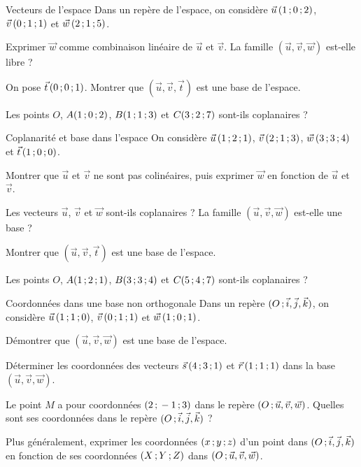 
\begin{exercice}[2]{Vecteurs de l'espace}
Dans un repère de l'espace, on considère $\vec u\,(1\,{;}\,0\,{;}\,2)$, $\vec v\,(0\,{;}\,1\,{;}\,1)$ et $\vec w\,(2\,{;}\,1\,{;}\,5)$.
\begin{questions}
  \item Exprimer $\vec w$ comme combinaison linéaire de $\vec u$ et $\vec v$. La famille $(\vec u,\vec v,\vec w)$ est-elle libre ?
  \item On pose $\vec t\,(0\,{;}\,0\,{;}\,1)$. Montrer que $(\vec u,\vec v,\vec t)$ est une base de l'espace.
  \item Les points $O$, $A(1\,{;}\,0\,{;}\,2)$, $B(1\,{;}\,1\,{;}\,3)$ et $C(3\,{;}\,2\,{;}\,7)$ sont-ils coplanaires ?
\end{questions}
\end{exercice}

\begin{exercice}[3]{Coplanarité et base dans l'espace}
On considère $\vec u\,(1\,{;}\,2\,{;}\,1)$, $\vec v\,(2\,{;}\,1\,{;}\,3)$, $\vec w\,(3\,{;}\,3\,{;}\,4)$ et $\vec t\,(1\,{;}\,0\,{;}\,0)$.
\begin{questions}
  \item Montrer que $\vec u$ et $\vec v$ ne sont pas colinéaires, puis exprimer $\vec w$ en fonction de $\vec u$ et $\vec v$.
  \item Les vecteurs $\vec u$, $\vec v$ et $\vec w$ sont-ils coplanaires ? La famille $(\vec u,\vec v,\vec w)$ est-elle une base ?
  \item Montrer que $(\vec u,\vec v,\vec t)$ est une base de l'espace.
  \item Les points $O$, $A(1\,{;}\,2\,{;}\,1)$, $B(3\,{;}\,3\,{;}\,4)$ et $C(5\,{;}\,4\,{;}\,7)$ sont-ils coplanaires ?
\end{questions}
\end{exercice}

\begin{exercice}[3]{Coordonnées dans une base non orthogonale}
Dans un repère $(O\,{;}\,\vec i,\vec j,\vec k)$, on considère $\vec u\,(1\,{;}\,1\,{;}\,0)$, $\vec v\,(0\,{;}\,1\,{;}\,1)$ et $\vec w\,(1\,{;}\,0\,{;}\,1)$.
\begin{questions}
  \item Démontrer que $(\vec u,\vec v,\vec w)$ est une base de l'espace.
  \item Déterminer les coordonnées des vecteurs $\vec s\,(4\,{;}\,3\,{;}\,1)$ et $\vec r\,(1\,{;}\,1\,{;}\,1)$ dans la base $(\vec u,\vec v,\vec w)$.
  \item Le point $M$ a pour coordonnées $(2\,{;}\,-1\,{;}\,3)$ dans le repère $(O\,{;}\,\vec u,\vec v,\vec w)$. Quelles sont ses coordonnées dans
    le repère $(O\,{;}\,\vec i,\vec j,\vec k)$ ?
  \item Plus généralement, exprimer les coordonnées $(x\,{;}\, y\,{;}\, z)$ d'un point dans $(O\,{;}\,\vec i,\vec j,\vec k)$ en fonction de ses
    coordonnées $(X\,{;}\, Y\,{;}\, Z)$ dans $(O\,{;}\,\vec u,\vec v,\vec w)$.
\end{questions}
\end{exercice}


